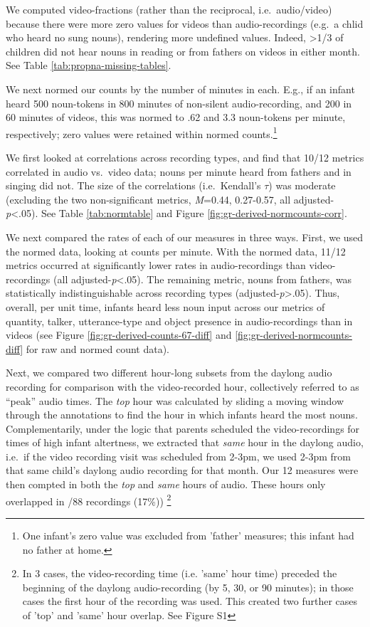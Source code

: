 \documentclass[man]{apa6}
\theoremstyle{definition}
\theoremstyle{definition}
\theoremstyle{definition}
\theoremstyle{remark}
\begin{document}
We computed video-fractions (rather than the reciprocal,
i.e.~audio/video) because there were more zero values for videos than
audio-recordings (e.g.~a chlid who heard no sung nouns), rendering more
undefined values. Indeed, \textgreater{}1/3 of children did not hear
nouns in reading or from fathers on videos in either month. See Table
\ref{tab:propna-missing-tables}.

We next normed our counts by the number of minutes in each. E.g., if an
infant heard 500 noun-tokens in 800 minutes of non-silent
audio-recording, and 200 in 60 minutes of videos, this was normed to .62
and 3.3 noun-tokens per minute, respectively; zero values were retained
within normed
counts.\footnote{One infant's zero value was excluded from 'father' measures; this infant had no father at home.}

We first looked at correlations across recording types, and find that
10/12 metrics correlated in audio vs.~video data; nouns per minute heard
from fathers and in singing did not. The size of the correlations
(i.e.~Kendall's \(\tau\)) was moderate (excluding the two
non-significant metrics, \emph{M}=0.44, 0.27-0.57, all
adjusted-\emph{p}\textless{}.05). See Table \ref{tab:normtable} and
Figure \ref{fig:gr-derived-normcounts-corr}.

We next compared the rates of each of our measures in three ways. First,
we used the normed data, looking at counts per minute. With the normed
data, 11/12 metrics occurred at significantly lower rates in
audio-recordings than video-recordings (all
adjusted-\emph{p}\textless{}.05). The remaining metric, nouns from
fathers, was statistically indistinguishable across recording types
(adjusted-\emph{p}\textgreater{}.05). Thus, overall, per unit time,
infants heard less noun input across our metrics of quantity, talker,
utterance-type and object presence in audio-recordings than in videos
(see Figure \ref{fig:gr-derived-counts-67-diff} and
\ref{fig:gr-derived-normcounts-diff} for raw and normed count data).

Next, we compared two different hour-long subsets from the daylong audio
recording for comparison with the video-recorded hour, collectively
referred to as \enquote{peak} audio times. The \emph{top} hour was
calculated by sliding a moving window through the annotations to find
the hour in which infants heard the most nouns. Complementarily, under
the logic that parents scheduled the video-recordings for times of high
infant altertness, we extracted that \emph{same} hour in the daylong
audio, i.e.~if the video recording visit was scheduled from 2-3pm, we
used 2-3pm from that same child's daylong audio recording for that
month. Our 12 measures were then compted in both the \emph{top} and
\emph{same} hours of audio. These hours only overlapped in /88
recordings (17\%))
\footnote{In 3 cases, the video-recording time (i.e. 'same' hour time) preceded the beginning of the daylong audio-recording (by 5, 30, or 90 minutes); in those cases the first hour of the recording was used. This created two further cases of 'top' and 'same' hour overlap. See Figure S1}
\end{document}
